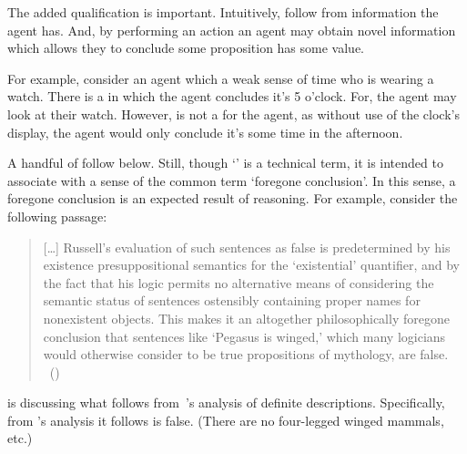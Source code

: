 \begin{note}[\fc{2} definition]
  The added qualification is important.
  Intuitively,  follow from information the agent has.
  And, by performing an action an agent may obtain novel information which allows they to conclude some proposition has some value.

  For example, consider an agent which a weak sense of time who is wearing a watch.
  There is a \pevent{} in which the agent concludes it's 5 o'clock.
  For, the agent may look at their watch.
  However,  is not a \fc{} for the agent, as without use of the clock's display, the agent would only conclude it's some time in the afternoon.
\end{note}

\begin{note}
  A handful of  follow below.
  Still, though `' is a technical term, it is intended to associate with a sense of the common term `foregone conclusion'.
  In this sense, a foregone conclusion is an expected result of reasoning.
  For example, consider the following passage:

  \begin{quote}
    [\dots] Russell's evaluation of such sentences as false is predetermined by his existence presuppositional semantics for the ‘existential' quantifier, and by the fact that his logic permits no alternative means of considering the semantic status of sentences ostensibly containing proper names for nonexistent objects.
    This makes it an altogether philosophically foregone conclusion that sentences like ‘Pegasus is winged,' which many logicians would otherwise consider to be true propositions of mythology, are false.\newline
    \mbox{ }\hfill\mbox{(\cite[6]{Jacquette:2002up})}
  \end{quote}

  \noindent \citeauthor{Jacquette:2002up} is discussing what follows from~\citeauthor{Russell:1905aa}'s analysis of definite descriptions.
  Specifically, from \citeauthor{Russell:1905aa}'s analysis it follows  is false.
  (There are no four-legged winged mammals, etc.)


\end{note}
